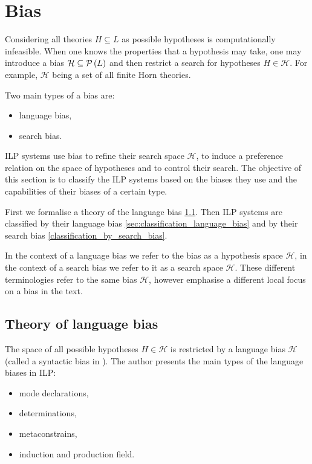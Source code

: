 \chapter{Bias\cite{nienhuys1997foundations}}\label{ch:bias}
Considering all theories $H \subseteq L$ as possible hypotheses is computationally infeasible. When one knows the properties that a hypothesis may take, one may introduce a bias $\mathcal{H} \subseteq \mathcal{P} \left({ L }\right)$ and then restrict a search for hypotheses $H \in \mathcal{H}$. For example, $\mathcal{H}$ being a set of all finite Horn theories.

Two main types of a bias are:
\begin{itemize}
\item language bias,
\item search bias.
\end{itemize}

ILP systems use bias to refine their search space $\mathcal{H}$, to induce a preference relation on the space of hypotheses and to control their search. The objective of this section is to classify the ILP systems based on the biases they use and the capabilities of their biases of a certain type.

First we formalise a theory of the language bias \ref{sec:background_language_bias}. Then ILP systems are classified by their language bias \ref{sec:classification_language_bias} and by their search bias \ref{classification_by_search_bias}.

In the context of a language bias we refer to the bias as a hypothesis space $\mathcal{H}$, in the context of a search bias we refer to it as a search space $\mathcal{H}$.
These different terminologies refer to the same bias $\mathcal{H}$, however emphasise a different local focus on a bias in the text.

\section{Theory of language bias}\label{sec:background_language_bias}
The space of all possible hypotheses $H \in \mathcal{H}$ is restricted by a language bias $\mathcal{H}$ (called a syntactic bias in \cite{muggleton1994inductive}). The author presents the main types of the language biases in ILP:
\begin{itemize}
\item mode declarations,
\item determinations,
\item metaconstrains,
\item induction and production field.
\end{itemize}

